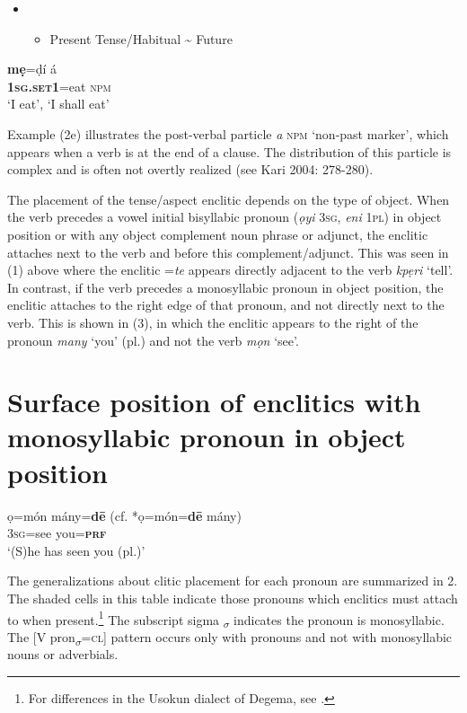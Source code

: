 \begin{itemize}
\item \setcounter{itemize}{0}
\begin{itemize}
\item \begin{stylelsEnumerated}
Present Tense/Habitual {\textasciitilde} Future
\end{stylelsEnumerated}
\end{itemize}
\end{itemize}
\gll \textbf{mẹ}=ḍí     á\\
     \textbf{\textsc{1sg.set1}}=eat  \textsc{npm}\\
\glt ‘I eat’, ‘I shall eat’ \citep[45]{Kari1997}
\z

Example (2e) illustrates the post-verbal particle \textit{a} \textsc{npm} ‘non-past marker’, which appears when a verb is at the end of a clause. The distribution of this particle is complex and is often not overtly realized (see Kari 2004: 278-280).

The placement of the tense/aspect enclitic depends on the type of object. When the verb precedes a vowel initial bisyllabic pronoun (\textit{ọyi} \textsc{3sg}, \textit{eni} \textsc{1pl}) in object position or with any object complement noun phrase or adjunct, the enclitic attaches next to the verb and before this complement/adjunct. This was seen in (1) above where the enclitic =\textit{te} appears directly adjacent to the verb \textit{kpẹri} ‘tell’. In contrast, if the verb precedes a monosyllabic pronoun in object position, the enclitic attaches to the right edge of that pronoun, and not directly next to the verb. This is shown in (3), in which the enclitic appears to the right of the pronoun \textit{many }‘you’ (pl.) and not the verb \textit{mọn} ‘see’.

\chapter[Surface position of enclitics with monosyllabic pronoun in object position]{Surface position of enclitics with monosyllabic pronoun in object position}
\label{bkm:Ref406317030}\gll ọ=món   mány=\textbf{d\={e}  }(cf. *ọ=món=\textbf{d\={e}} mány)\\
     3\textsc{sg}=see   you=\textbf{\textsc{prf}}\\
\glt ‘(S)he has seen you (pl.)’ \citep[341]{Kari2004} 
\z

The generalizations about clitic placement for each pronoun are summarized in 2. The shaded cells in this table indicate those pronouns which enclitics must attach to when present.\footnote{For differences in the Usokun dialect of Degema, see \citet{Offah2000}. 
} The subscript sigma \textsubscript{$\sigma $} indicates the pronoun is monosyllabic. The [V pron\textsubscript{$\sigma $}=\textsc{cl}] pattern occurs only with pronouns and not with monosyllabic nouns or adverbials.

